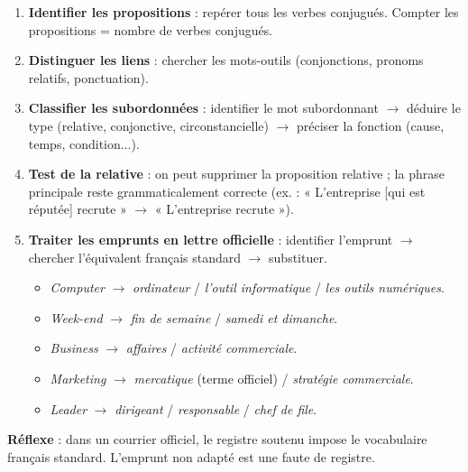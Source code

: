 \documentclass[11pt]{article}
\begin{document}
\begin{methode}
\begin{enumerate}
\item \textbf{Identifier les propositions} : repérer tous les verbes conjugués. Compter les propositions = nombre de verbes conjugués.
\item \textbf{Distinguer les liens} : chercher les mots-outils (conjonctions, pronoms relatifs, ponctuation).
\item \textbf{Classifier les subordonnées} : identifier le mot subordonnant $\rightarrow$ déduire le type (relative, conjonctive, circonstancielle) $\rightarrow$ préciser la fonction (cause, temps, condition...).
\item \textbf{Test de la relative} : on peut supprimer la proposition relative ; la phrase principale reste grammaticalement correcte (ex. : « L'entreprise [qui est réputée] recrute » $\rightarrow$ « L'entreprise recrute »).
\item \textbf{Traiter les emprunts en lettre officielle} : identifier l'emprunt $\rightarrow$ chercher l'équivalent français standard $\rightarrow$ substituer.
\begin{itemize}
\item \emph{Computer} $\rightarrow$ \emph{ordinateur} / \emph{l'outil informatique} / \emph{les outils numériques}.
\item \emph{Week-end} $\rightarrow$ \emph{fin de semaine} / \emph{samedi et dimanche}.
\item \emph{Business} $\rightarrow$ \emph{affaires} / \emph{activité commerciale}.
\item \emph{Marketing} $\rightarrow$ \emph{mercatique} (terme officiel) / \emph{stratégie commerciale}.
\item \emph{Leader} $\rightarrow$ \emph{dirigeant} / \emph{responsable} / \emph{chef de file}.
\end{itemize}
\end{enumerate}
\textbf{Réflexe} : dans un courrier officiel, le registre soutenu impose le vocabulaire français standard. L'emprunt non adapté est une faute de registre.
\end{methode}
\end{document}
